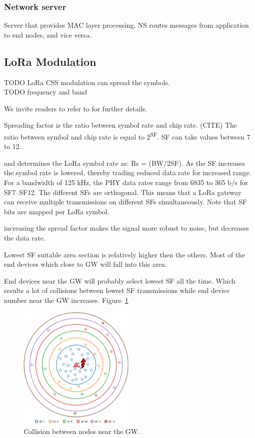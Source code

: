 \documentclass[conference]{IEEEtran}
\begin{document}
\subsubsection{Network server}
Server that provides MAC layer processing. NS routes messages from application to end nodes, and vice versa.

\subsection{LoRa Modulation}
\par TODO
LoRa CSS modulation can spread the symbols.\\
TODO frequency and band

We invite readers to refer to \cite{AN1200.22} for further details.

\par Spreading factor is the ratio between symbol rate and chip rate. (CITE) The ratio between symbol and chip rate is equal to $2$\textsuperscript{SF}. SF can take values between 7 to 12.

and determines the LoRa symbol rate as: Rs = (BW/2SF). As the SF increases the symbol rate is lowered, thereby trading reduced data rate for increased range. For a bandwidth of 125 kHz, the PHY data rates range from 6835 to 365 b/s for SF7–SF12. The different SFs are orthogonal. This means that a LoRa gateway can receive multiple transmissions on different SFs simultaneously. Note that SF bits are mapped per LoRa symbol.

increasing the spread factor makes the signal more robust to noise, but decreases the data rate.


\par Lowest SF suitable area section is relatively higher then the others. Most of the end devices which close to GW will fall into this area.

\par End devices near the GW will probably select lowest SF all the time. Which results a lot of collisions between lowest SF transmissions while end device number near the GW increases. Figure~\ref{fig:collision}

\begin{figure}
\centering
\includegraphics[width=0.5\textwidth]{collision}
\caption{Collision between nodes near the GW.}
\label{fig:collision}
\end{figure}
\end{document}

